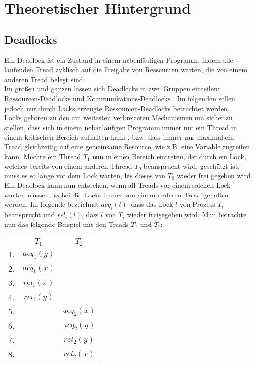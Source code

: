 \chapter{Theoretischer Hintergrund}

\section{Deadlocks}

Ein Deadlock ist ein Zustand in einem nebenläufigen Programm, indem alle laufenden Tread zyklisch auf die Freigabe von Ressourcen warten, die von einem anderen Tread belegt sind.\\
Im großen und ganzen lassen sich Deadlocks in zwei Gruppen einteilen: Ressourcen-Deadlocks und Kommunikations-Deadlocks \cite{zhou}.
Im folgenden sollen jedoch nur durch Locks erzeugte Ressourcen-Deadlocks betrachtet werden.\\
Locks gehören zu den am weitesten verbreiteten Mechanismen um sicher zu stellen, dass sich in einem nebenläufigen Programm immer nur ein Thread in einem kritischen Bereich aufhalten kann \cite*{zhou}, bzw.
dass immer nur maximal ein Tread gleichzeitig auf eine gemeinsame Resource, wie 
z.B. eine Variable zugreifen kann. Möchte ein Thread $T_1$ nun in einen Bereich eintreten, der durch ein Lock, welches bereits von einem anderen Thread $T_0$ beansprucht wird, geschützt ist, muss es so lange vor dem Lock warten, bis dieses von $T_0$ wieder frei gegeben wird.\\
Ein Deadlock kann nun entstehen, wenn all Treads vor einem solchen Lock warten müssen, wobei die Locks immer von einem anderen Tread gehalten werden. Im folgende bezeichnet $acq_i(l)$, dass das Lock $l$ von Prozess $T_i$ beansprucht und $rel_i(l)$, dass $l$ von $T_i$ wieder freigegeben wird. Man betrachte nun das folgende Beispiel \cite{sulzmann} mit den Treads $T_1$ und $T_2$:
\begin{table}[H]
    \centering
    \begin{tabular}{ccc}
       & $T_1$        & $T_2$          \\
    1. & $acq_{1}(y)$ &                \\
    2. & $acq_{1}(x)$ &                \\
    3. & $rel_{1}(x)$ &                \\
    4. & $rel_{1}(y)$ &                \\
    5. &              & $acq_{2}(x)$ \\
    6. &              & $acq_{2}(y)$ \\
    7. &              & $rel_{2}(y)$ \\
    8. &              & $rel_{2}(x)$
    \end{tabular}
\end{table}
